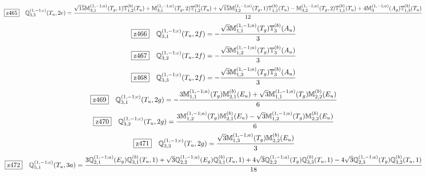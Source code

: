 \documentclass[fleqn,10pt,landscape]{jsarticle}
\begin{document}
\begin{dmath*}
\hspace*{3mm}\fbox{z465}\quad \mathbb{Q}_{3,3}^{(1,-1;c)}(T_{u},2e)=\frac{\sqrt{15} \mathbb{M}_{3,1}^{(1,-1;a)}(T_{g},1) \mathbb{T}_{1,2}^{(b)}(T_{u}) + \mathbb{M}_{3,1}^{(1,-1;a)}(T_{g},2) \mathbb{T}_{1,2}^{(b)}(T_{u}) + \sqrt{15} \mathbb{M}_{3,2}^{(1,-1;a)}(T_{g},1) \mathbb{T}_{1,1}^{(b)}(T_{u}) - \mathbb{M}_{3,2}^{(1,-1;a)}(T_{g},2) \mathbb{T}_{1,1}^{(b)}(T_{u}) + 4 \mathbb{M}_{3}^{(1,-1;a)}(A_{g}) \mathbb{T}_{1,3}^{(b)}(T_{u})}{12}
\end{dmath*}
\begin{dmath*}
\hspace*{3mm}\fbox{z466}\quad \mathbb{Q}_{3,1}^{(1,-1;c)}(T_{u},2f)=- \frac{\sqrt{3} \mathbb{M}_{1,1}^{(1,-1;a)}(T_{g}) \mathbb{T}_{3}^{(b)}(A_{u})}{3}
\end{dmath*}
\begin{dmath*}
\hspace*{3mm}\fbox{z467}\quad \mathbb{Q}_{3,2}^{(1,-1;c)}(T_{u},2f)=- \frac{\sqrt{3} \mathbb{M}_{1,2}^{(1,-1;a)}(T_{g}) \mathbb{T}_{3}^{(b)}(A_{u})}{3}
\end{dmath*}
\begin{dmath*}
\hspace*{3mm}\fbox{z468}\quad \mathbb{Q}_{3,3}^{(1,-1;c)}(T_{u},2f)=- \frac{\sqrt{3} \mathbb{M}_{1,3}^{(1,-1;a)}(T_{g}) \mathbb{T}_{3}^{(b)}(A_{u})}{3}
\end{dmath*}
\begin{dmath*}
\hspace*{3mm}\fbox{z469}\quad \mathbb{Q}_{3,1}^{(1,-1;c)}(T_{u},2g)=- \frac{3 \mathbb{M}_{1,1}^{(1,-1;a)}(T_{g}) \mathbb{M}_{2,1}^{(b)}(E_{u}) + \sqrt{3} \mathbb{M}_{1,1}^{(1,-1;a)}(T_{g}) \mathbb{M}_{2,2}^{(b)}(E_{u})}{6}
\end{dmath*}
\begin{dmath*}
\hspace*{3mm}\fbox{z470}\quad \mathbb{Q}_{3,2}^{(1,-1;c)}(T_{u},2g)=\frac{3 \mathbb{M}_{1,2}^{(1,-1;a)}(T_{g}) \mathbb{M}_{2,1}^{(b)}(E_{u}) - \sqrt{3} \mathbb{M}_{1,2}^{(1,-1;a)}(T_{g}) \mathbb{M}_{2,2}^{(b)}(E_{u})}{6}
\end{dmath*}
\begin{dmath*}
\hspace*{3mm}\fbox{z471}\quad \mathbb{Q}_{3,3}^{(1,-1;c)}(T_{u},2g)=\frac{\sqrt{3} \mathbb{M}_{1,3}^{(1,-1;a)}(T_{g}) \mathbb{M}_{2,2}^{(b)}(E_{u})}{3}
\end{dmath*}
\begin{dmath*}
\hspace*{3mm}\fbox{z472}\quad \mathbb{Q}_{5,1}^{(1,-1;c)}(T_{u},3a)=\frac{3 \mathbb{Q}_{2,1}^{(1,-1;a)}(E_{g}) \mathbb{Q}_{3,1}^{(b)}(T_{u},1) + \sqrt{3} \mathbb{Q}_{2,2}^{(1,-1;a)}(E_{g}) \mathbb{Q}_{3,1}^{(b)}(T_{u},1) + 4 \sqrt{3} \mathbb{Q}_{2,2}^{(1,-1;a)}(T_{g}) \mathbb{Q}_{3,3}^{(b)}(T_{u},1) - 4 \sqrt{3} \mathbb{Q}_{2,3}^{(1,-1;a)}(T_{g}) \mathbb{Q}_{3,2}^{(b)}(T_{u},1)}{18}
\end{dmath*}
\end{document}
